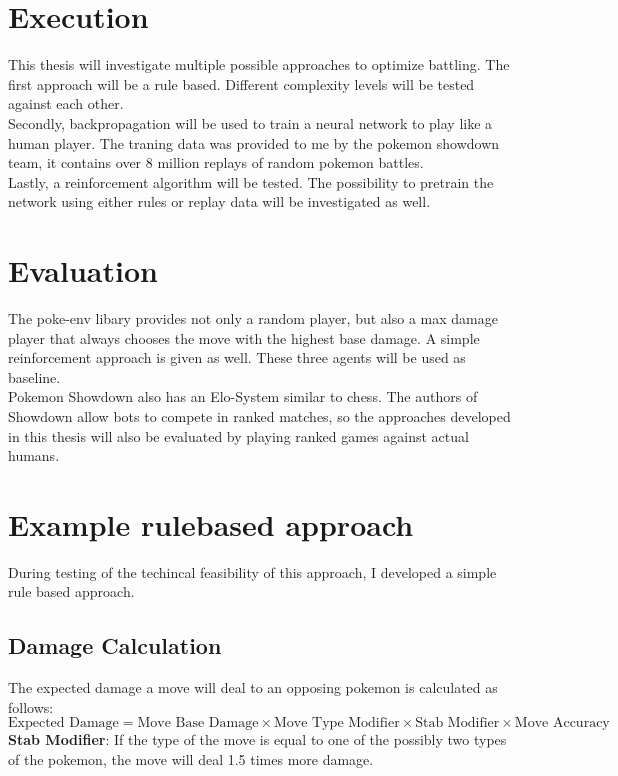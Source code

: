 \documentclass{article}
\begin{document}
\section{Execution}
This thesis will investigate multiple possible approaches to optimize battling.
The first approach will be a rule based. Different complexity levels will be
tested against each other. \\
Secondly, backpropagation will be used to train a neural network to play
like a human player. The traning data was provided to me by the pokemon
showdown team, it contains over 8 million replays of random pokemon battles. \\
Lastly, a reinforcement algorithm will be tested. The possibility to pretrain
the network using either rules or replay data will be investigated as well.

\section{Evaluation}
The poke-env libary provides not only a random player, but also a max damage player
that always chooses the move with the highest base damage. A simple reinforcement
approach is given as well. These three agents will be used as baseline. \\
Pokemon Showdown also has an Elo-System similar to chess. The authors of 
Showdown allow bots to compete in ranked matches, so the approaches
developed in this thesis will also be evaluated by playing ranked games 
against actual humans.

\section{Example rulebased approach}
\label{sec:rulebased}
During testing of the techincal feasibility of this approach, I developed a 
simple rule based approach.

\subsection{Damage Calculation}
The expected damage a move will deal to an opposing pokemon is calculated as follows:
\begin{equation*}
    \text{Expected Damage} = \text{Move Base Damage} \times \text{Move Type Modifier} 
        \times \text{Stab Modifier}
        \times \text{Move Accuracy}
\end{equation*}
\textbf{Stab Modifier}: If the type of the move is equal to one of the possibly two types
of the pokemon, the move will deal 1.5 times more damage. 
\end{document}
